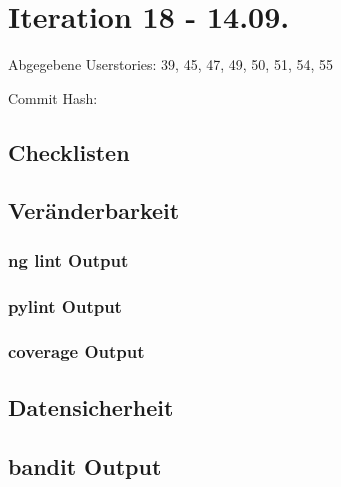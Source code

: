 \section{Iteration 18 - 14.09.}
	Abgegebene Userstories: 39, 45, 47, 49, 50, 51, 54, 55
	
	Commit Hash: 
	
	\subsection{Checklisten}
	
	
	
	
	
	
	
	
	\subsection{Veränderbarkeit}
	\subsubsection{ng lint Output}
	

	\subsubsection{pylint Output}
	

	\subsubsection{coverage Output}
	

	\subsection{Datensicherheit}
	\subsection{bandit Output}
	
	
